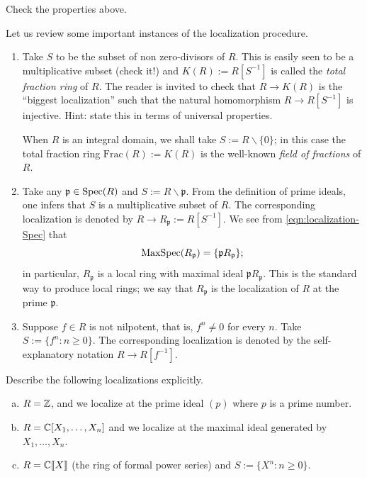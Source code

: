 \begin{exercise}
	Check the properties above.
\end{exercise}

Let us review some important instances of the localization procedure.
\begin{enumerate}
	\item Take $S$ to be the subset of non zero-divisors of $R$. This is easily seen to be a multiplicative subset (check it!) and $K(R) := R[S^{-1}]$ is called the \emph{total fraction ring} of $R$. The reader is invited to check that $R \to K(R)$ is the ``biggest localization'' such that the natural homomorphism $R \to R[S^{-1}]$ is injective. Hint: state this in terms of universal properties.
	
	When $R$ is an integral domain, we shall take $S := R \smallsetminus \{0\}$; in this case the total fraction ring $\text{Frac}(R) := K(R)$ is the well-known \emph{field of fractions} of $R$.
	
	\item Take any $\mathfrak{p} \in \operatorname{Spec}(R)$ and $S := R \smallsetminus \mathfrak{p}$. From the definition of prime ideals, one infers that $S$ is a multiplicative subset of $R$. The corresponding localization is denoted by $R \to R_{\mathfrak{p}} := R[S^{-1}]$. We see from \eqref{eqn:localization-Spec} that
		\[ \operatorname{MaxSpec}(R_{\mathfrak{p}}) = \{ \mathfrak{p} R_{\mathfrak{p}} \}; \]
	in particular, $R_{\mathfrak{p}}$ is a local ring with maximal ideal $\mathfrak{p}R_{\mathfrak{p}}$. This is the standard way to produce local rings; we say that $R_{\mathfrak{p}}$ is the localization of $R$ at the prime $\mathfrak{p}$.

	\item Suppose $f \in R$ is not nilpotent, that is, $f^n \neq 0$ for every $n$. Take $S := \{ f^n : n \geq 0 \}$. The corresponding localization is denoted by the self-explanatory notation $R \to R[f^{-1}]$.
\end{enumerate}

\begin{exercise}
	Describe the following localizations explicitly.
	\begin{enumerate}[(a)]
		\item $R = \mathbb{Z}$, and we localize at the prime ideal $(p)$ where $p$ is a prime number.
		\item $R = \mathbb{C}[X_1, \ldots, X_n]$ and we localize at the maximal ideal generated by $X_1, \ldots, X_n$.
		\item $R = \mathbb{C}\llbracket X \rrbracket$ (the ring of formal power series) and $S := \{X^n : n \geq 0 \}$.
	\end{enumerate}
\end{exercise}

